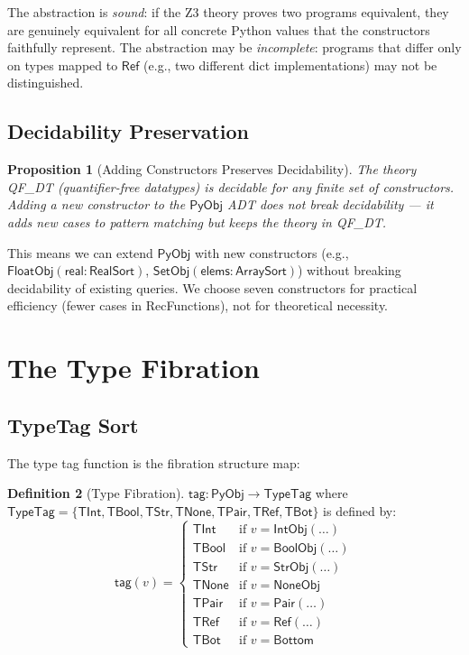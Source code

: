 \documentclass[11pt,a4paper]{report}
\theoremstyle{definition}
\newtheorem{definition}{Definition}[chapter]
\theoremstyle{plain}
\newtheorem{proposition}[definition]{Proposition}
\newcommand{\PyObj}{\mathsf{PyObj}}
\begin{document}
The abstraction is \emph{sound}: if the Z3 theory proves two
programs equivalent, they are genuinely equivalent for all concrete
Python values that the constructors faithfully represent.  The
abstraction may be \emph{incomplete}: programs that differ only on
types mapped to $\mathsf{Ref}$ (e.g., two different dict
implementations) may not be distinguished.

\subsection{Decidability Preservation}

\begin{proposition}[Adding Constructors Preserves Decidability]
\label{prop:adt-decidable}
The theory QF\_DT (quantifier-free datatypes) is decidable for any
finite set of constructors.  Adding a new constructor to the $\PyObj$
ADT does not break decidability --- it adds new cases to pattern
matching but keeps the theory in QF\_DT.
\end{proposition}

This means we can extend $\PyObj$ with new constructors (e.g.,
$\mathsf{FloatObj}(\mathsf{real} : \mathsf{RealSort})$,
$\mathsf{SetObj}(\mathsf{elems} : \mathsf{ArraySort})$) without
breaking decidability of existing queries.  We choose seven
constructors for practical efficiency (fewer cases in RecFunctions),
not for theoretical necessity.

\section{The Type Fibration}

\subsection{TypeTag Sort}

The type tag function is the fibration structure map:

\begin{definition}[Type Fibration]
$\mathsf{tag} : \PyObj \to \mathsf{TypeTag}$ where
$\mathsf{TypeTag} = \{\mathsf{TInt}, \mathsf{TBool}, \mathsf{TStr},
\mathsf{TNone}, \mathsf{TPair}, \mathsf{TRef}, \mathsf{TBot}\}$
is defined by:
\[
  \mathsf{tag}(v) = \begin{cases}
    \mathsf{TInt} & \text{if } v = \mathsf{IntObj}(\ldots) \\
    \mathsf{TBool} & \text{if } v = \mathsf{BoolObj}(\ldots) \\
    \mathsf{TStr} & \text{if } v = \mathsf{StrObj}(\ldots) \\
    \mathsf{TNone} & \text{if } v = \mathsf{NoneObj} \\
    \mathsf{TPair} & \text{if } v = \mathsf{Pair}(\ldots) \\
    \mathsf{TRef} & \text{if } v = \mathsf{Ref}(\ldots) \\
    \mathsf{TBot} & \text{if } v = \mathsf{Bottom}
  \end{cases}
\]
\end{definition}
\end{document}
